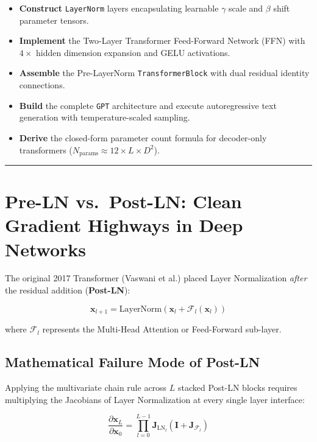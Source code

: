 \documentclass[
  letterpaper,
]{scrbook}
\providecommand{\tightlist}{%
  \setlength{\itemsep}{0pt}\setlength{\parskip}{0pt}}
\begin{document}
\begin{itemize}
\tightlist
\item
  \textbf{Construct} \texttt{LayerNorm} layers encapsulating learnable
  \(\gamma\) scale and \(\beta\) shift parameter tensors.
\item
  \textbf{Implement} the Two-Layer Transformer Feed-Forward Network
  (FFN) with \(4\times\) hidden dimension expansion and GELU
  activations.
\item
  \textbf{Assemble} the Pre-LayerNorm \texttt{TransformerBlock} with
  dual residual identity connections.
\item
  \textbf{Build} the complete \texttt{GPT} architecture and execute
  autoregressive text generation with temperature-scaled sampling.
\item
  \textbf{Derive} the closed-form parameter count formula for
  decoder-only transformers
  (\(N_{\text{params}} \approx 12 \times L \times D^2\)).
\end{itemize}

\begin{center}\rule{0.5\linewidth}{0.5pt}\end{center}

\section{Pre-LN vs.~Post-LN: Clean Gradient Highways in Deep
Networks}\label{pre-ln-vs.-post-ln-clean-gradient-highways-in-deep-networks}

The original 2017 Transformer (Vaswani et al.) placed Layer
Normalization \emph{after} the residual addition (\textbf{Post-LN}):

\[\mathbf{x}_{l+1} = \text{LayerNorm}(\mathbf{x}_l + \mathcal{F}_l(\mathbf{x}_l))\]

where \(\mathcal{F}_l\) represents the Multi-Head Attention or
Feed-Forward sub-layer.

\subsection{Mathematical Failure Mode of
Post-LN}\label{mathematical-failure-mode-of-post-ln}

Applying the multivariate chain rule across \(L\) stacked Post-LN blocks
requires multiplying the Jacobians of Layer Normalization at every
single layer interface:

\[\frac{\partial \mathbf{x}_L}{\partial \mathbf{x}_0} = \prod_{l=0}^{L-1} \mathbf{J}_{\text{LN}_l} \left( \mathbf{I} + \mathbf{J}_{\mathcal{F}_l} \right)\]
\end{document}
